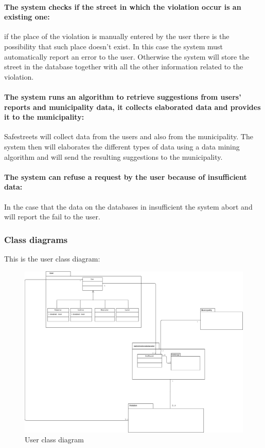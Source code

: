 \documentclass[titlepage]{article}
\begin{document}
\paragraph{The system checks if the street in which the 				violation occur is an existing one: }
if the place of the violation is manually entered by the user there is the possibility that such place doesn't exist. In this case the system must automatically report an error to the user. Otherwise the system will store the street in the database together with all the other information related to the violation.
\paragraph{The system runs an algorithm to retrieve suggestions from users' reports and municipality data, it collects elaborated data and provides it to the municipality: }
Safestreets will collect data from the users and also from the municipality. The system then will elaborates the different types of data using a data mining algorithm and will send the resulting suggestions to the municipality. 
\paragraph{The system can refuse a request by the user because of 
	insufficient data:}
	In the case that the data on the databases in insufficient the system abort and will report the fail to the 
	user.
\newpage
\subsubsection{Class diagrams}
This is the user class diagram:
\begin{figure}[h
]
	\includegraphics[scale=0.332]{UML users v1.0.png}
	\centering
	\caption{User class diagram}
\end{figure}
\FloatBarrier
\end{document}
